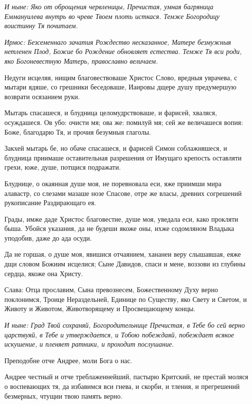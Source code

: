 \itshape И ныне\normalfont{}: Яко от оброщения червленицы, Пречистая, умная багряница Еммануилева внутрь во чреве Твоем плоть исткася. Темже Богородицу воистинну Тя почитаем. 


\itshape Ирмос\normalfont{}: Безсеменнаго зачатия Рождество несказанное, Матере безмужныя нетленен Плод, Божие бо Рождение обновляет естества. Темже Тя вси роди, яко Богоневестную Матерь, православно величаем. 

Недуги исцеляя, нищим благовествоваше Христос Слово, вредныя уврачева, с мытари ядяше, со грешники беседоваше, Иаировы дщере душу предумершую возврати осязанием руки. 

Мытарь спасашеся, и блудница целомудрствоваше, и фарисей, хваляся, осуждашеся. Ов убо: очисти мя; ова же: помилуй мя; сей же величашеся вопия: Боже, благодарю Тя, и прочия безумныя глаголы. 

Закхей мытарь бе, но обаче спасашеся, и фарисей Симон соблажняшеся, и блудница приимаше оставительная разрешения от Имущаго крепость оставляти грехи, юже, душе, потщися подражати. 

Блуднице, о окаянная душе моя, не поревновала еси, яже приимши мира алавастр, со слезами мазаше нозе Спасове, отре же власы, древних согрешений рукописание Раздирающаго ея. 

Грады, имже даде Христос благовестие, душе моя, уведала еси, како прокляти быша. Убойся указания, да не будеши якоже оны, ихже содомляном Владыка уподобив, даже до ада осуди. 

Да не горшая, о душе моя, явишися отчаянием, хананеи веру слышавшая, еяже дщи словом Божиим исцелися; Сыне Давидов, спаси и мене, воззови из глубины сердца, якоже она Христу. 

Слава: Отца прославим, Сына превознесем, Божественному Духу верно поклонимся, Троице Нераздельней, Единице по Существу, яко Свету и Светом, и Животу и Животом, Животворящему и Просвещающему концы. 

\itshape И ныне\normalfont{}: Град Твой сохраняй, Богородительнице Пречистая, в Тебе бо сей верно царствуяй, в Тебе и утверждается, и Тобою побеждаяй, побеждает всякое искушение, и пленяет ратники, и проходит послушание. 

\bfseries 

Преподобне отче Андрее, моли Бога о нас.\normalfont{}

Андрее честный и отче треблаженнейший, пастырю Критский, не престай моляся о воспевающих тя, да избавимся вси гнева, и скорби, и тления, и прегрешений безмерных, чтущии твою память верно. 


